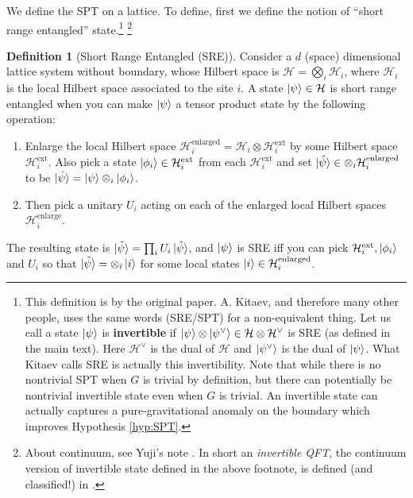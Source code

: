 \documentclass[
]{scrartcl}
\providecommand{\tightlist}{%
  \setlength{\itemsep}{0pt}\setlength{\parskip}{0pt}}
\numberwithin{equation}{section}
\theoremstyle{definition}
\newtheorem{definition}{Definition}[section]
\theoremstyle{definition}
\theoremstyle{definition}
\theoremstyle{definition}
\theoremstyle{remark}
\begin{document}
We define the SPT on a lattice.
To define, first we define the notion of ``short range entangled'' state.\footnote{This definition is by the original paper. A. Kitaev, and therefore many other people, uses the same words (SRE/SPT) for a non-equivalent thing. Let us call a state \(\ket{\psi}\) is \textbf{invertible} if \(\ket{\psi}\otimes \ket{\psi^\vee} \in \mathcal{H} \otimes \mathcal{H}^\vee\) is SRE (as defined in the main text). Here \(\mathcal{H}^\vee\) is the dual of \(\mathcal{H}\) and \(\ket{\psi^\vee}\) is the dual of \(\ket{\psi}\). What Kitaev calls SRE is actually this invertibility.
  Note that while there is no nontrivial SPT when \(G\) is trivial by definition, but there can potentially be nontrivial invertible state even when \(G\) is trivial. An invertible state can actually captures a pure-gravitational anomaly on the boundary which improves Hypothesis \ref{hyp:SPT}.} \footnote{About continuum, see Yuji's note \textcite{tachikawa_2019}. In short an \emph{invertible QFT}, the continuum version of invertible state defined in the above footnote, is defined (and classified!) in \textcite{Freed:2016rqq}.}

\begin{definition}[Short Range Entangled (SRE)]
\protect\hypertarget{def:SRE}{}\label{def:SRE}Consider a \(d\) (space) dimensional lattice system without boundary, whose Hilbert space is \(\mathcal{H} = \bigotimes_{i} \mathcal{H}_i\), where \(\mathcal{H}_i\) is the local Hilbert space associated to the site \(i\).
A state \(\ket{\psi} \in \mathcal{H}\) is short range entangled when you can make \(\ket{\psi}\) a tensor product state by the following operation:

\begin{enumerate}
\def\labelenumi{\arabic{enumi}.}
\tightlist
\item
  Enlarge the local Hilbert space \(\mathcal{H}^\text{enlarged}_i = \mathcal{H}_i \otimes \mathcal{H}_i^\text{ext}\) by some Hilbert space \(\mathcal{H}_i^\text{ext}\).
  Also pick a state \(\ket{\phi_i} \in \mathcal{H}_i^\text{ext}\) from each \(\mathcal{H}_i^\text{ext}\) and set \(\ket{\hat\psi}\in \otimes_i \mathcal{H}_i^\text{enlarged}\) to be \(\ket{\hat\psi} = \ket{\psi}\otimes_i \ket{\phi_i}\).
\item
  Then pick a unitary \(U_i\) acting on each of the enlarged local Hilbert spaces \(\mathcal{H}_i^\text{enlarge}\).
\end{enumerate}

The resulting state is \(\ket{\tilde{\psi}}=\prod_i U_i \ket{\hat{\psi}}\), and \(\ket{\psi}\) is SRE iff you can pick \(\mathcal{H}_i^\text{ext}, \ket{\phi_i}\) and \(U_i\) so that \(\ket{\tilde{\psi}} = \otimes_i \ket{i}\) for some local states \(\ket{i} \in \mathcal{H}^\text{enlarged}_i\).
\end{definition}
\end{document}

